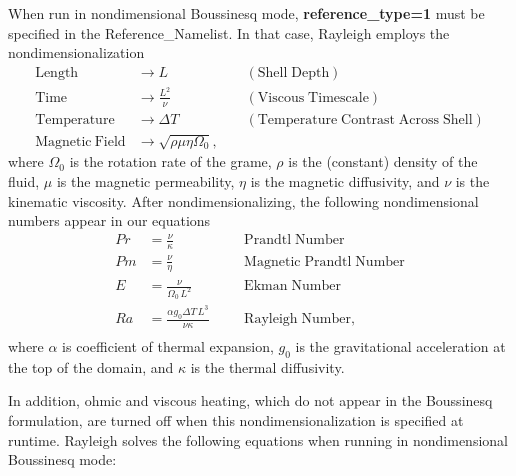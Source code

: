 When run in nondimensional Boussinesq mode, \textbf{reference\_type=1} must be specified in the Reference\_Namelist.  In that case, Rayleigh employs the nondimensionalization
\begin{align*}
\mathrm{Length} &\rightarrow L &\;\;\;\; \mathrm{(Shell\; Depth)} \\
\mathrm{Time} &\rightarrow   \frac{L^2}{\nu} &\;\;\;\; \mathrm{(Viscous\; Timescale)}\\
\mathrm{Temperature} &\rightarrow \Delta T&\;\;\;\; \mathrm{(Temperature\; Contrast\; Across\; Shell)} \\
\mathrm{Magnetic~Field} &\rightarrow \sqrt{\rho\mu\eta\Omega_0},
\end{align*}
where $\Omega_0$ is the rotation rate of the grame, $\rho$ is the (constant) density of the fluid, $\mu$ is the magnetic permeability, $\eta$ is the magnetic diffusivity, and $\nu$ is the kinematic viscosity.  After nondimensionalizing, the following nondimensional numbers appear in our equations
\begin{align*}
Pr &=\frac{\nu}{\kappa}                          &\;\;\;\;\;\; \mathrm{Prandtl\; Number} \\
Pm &=\frac{\nu}{\eta}                            &\;\;\;\;\;\; \mathrm{Magnetic\; Prandtl\; Number} \\
E  &=\frac{\nu}{\Omega_0\,L^2}                   &\;\;\;\;\;\; \mathrm{Ekman\; Number} \\
Ra &=\frac{\alpha g_0 \Delta T\,L^3}{\nu\kappa}  &\;\;\;\;\;\; \mathrm{Rayleigh\; Number}, \\
\end{align*}
where $\alpha$ is coefficient of thermal expansion, $g_0$ is the gravitational acceleration at the top of the domain, and $\kappa$ is the thermal diffusivity.

 In addition, ohmic and viscous heating, which do not appear in the Boussinesq formulation, are turned off when this nondimensionalization is specified at runtime.   Rayleigh solves the following equations when running in nondimensional Boussinesq mode:

